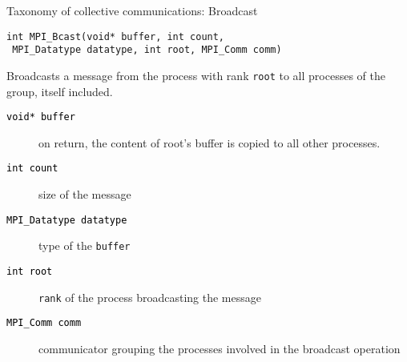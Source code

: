 \documentclass[xcolor={svgnames,usenames}]{beamer}
\begin{document}
\begin{frame}[fragile]{Taxonomy of collective communications: Broadcast}
\begin{verbatim}
int MPI_Bcast(void* buffer, int count, 
 MPI_Datatype datatype, int root, MPI_Comm comm)
\end{verbatim}
Broadcasts a message from the process with rank \texttt{root} to all processes of the group, itself included.
\begin{description}
	\item[\textcolor{black}{\texttt{void* buffer}}] on return, the content of root's
	buffer is copied to all other processes.
	\item[\textcolor{black}{\texttt{int count}}] size of the message
	\item[\textcolor{black}{\texttt{MPI_Datatype datatype}}]  type of the \texttt{buffer}
	\item[\textcolor{black}{\texttt{int root}}] \texttt{rank} of the process broadcasting the message
	\item[\textcolor{black}{\texttt{MPI_Comm comm}}] communicator grouping the processes involved in the broadcast operation
\end{description}
\end{frame}
\end{document}
